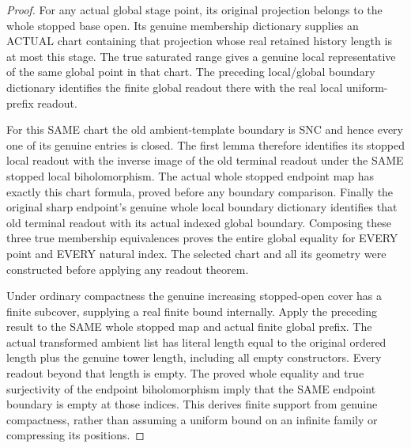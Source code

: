 \begin{proof}
For any actual global stage point, its original projection belongs to the
whole stopped base open. Its genuine membership dictionary supplies an
ACTUAL chart containing that projection whose real retained history length
is at most this stage. The true saturated range gives a genuine local
representative of the same global point in that chart. The preceding
local/global boundary dictionary identifies the finite global readout
there with the real local uniform-prefix readout.

For this SAME chart the old ambient-template boundary is SNC and hence
every one of its genuine entries is closed. The first lemma therefore
identifies its stopped local readout with the inverse image of the old
terminal readout under the SAME stopped local biholomorphism. The actual
whole stopped endpoint map has exactly this chart formula, proved before
any boundary comparison. Finally the original sharp endpoint's genuine
whole local boundary dictionary identifies that old terminal readout
with its actual indexed global boundary. Composing these three true
membership equivalences proves the entire global equality for EVERY
point and EVERY natural index. The selected chart and all its geometry
were constructed before applying any readout theorem.

Under ordinary compactness the genuine increasing stopped-open cover has
a finite subcover, supplying a real finite bound internally. Apply the
preceding result to the SAME whole stopped map and actual finite global
prefix. The actual transformed ambient list has literal length equal to
the original ordered length plus the genuine tower length, including all
empty constructors. Every readout beyond that length is empty. The proved
whole equality and true surjectivity of the endpoint biholomorphism imply
that the SAME endpoint boundary is empty at those indices. This derives
finite support from genuine compactness, rather than assuming a uniform
bound on an infinite family or compressing its positions.
\end{proof}
